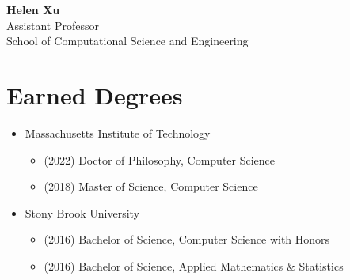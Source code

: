 





\thispagestyle{empty}
\tableofcontents
{}
\newpage

\setcounter{page}{1}
\begin{center}
    {\Large \bf Helen Xu}  \smallskip \\
    {\large Assistant Professor} \\
    {\large School of Computational Science and Engineering}
\end{center}

\section{Earned Degrees}
\begin{adjustwidth}{2em}{0pt}

\begin{itemize}
    \item Massachusetts Institute of Technology
    \begin{itemize}
        \item[] (2022) Doctor of Philosophy, Computer Science
        \item[] (2018) Master of Science, Computer Science
    \end{itemize}
    \item Stony Brook University
    \begin{itemize}
        \item[] (2016) Bachelor of Science, Computer Science with Honors
        \item[] (2016) Bachelor of Science, Applied Mathematics \& Statistics
    \end{itemize}
\end{itemize}

\end{adjustwidth}

